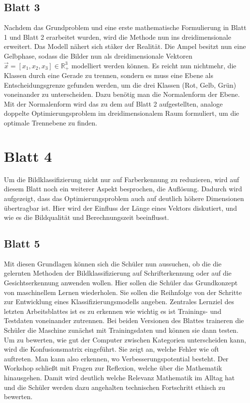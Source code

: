         \subsection{Blatt 3}
            Nachdem das Grundproblem und eine erste mathematische Formulierung in Blatt 1 und Blatt 2 erarbeitet wurden, wird die Methode nun ins dreidimensionale erweitert. Das Modell nähert sich stäker der Realität. Die Ampel besitzt nun eine Gelbphase, sodass die Bilder nun als dreidimensionale Vektoren $\vec{x}=[x_1, x_2, x_3] \in \mathbb{R}_+^3$ modelliert werden können.
            Es reicht nun nichtmehr, die Klassen durch eine Gerade zu trennen, sondern es muss eine Ebene als Entscheidungsgrenze gefunden werden, um die drei Klassen (Rot, Gelb, Grün) voneinander zu unterscheiden.
            Dazu benötig man die Normalenform der Ebene. Mit der Normalenform wird das zu dem auf Blatt 2 aufgestellten, analoge doppelte Optimierungsproblem im dreidimensionalem Raum formuliert, um die optimale Trennebene zu finden.
        \section{Blatt 4}
            Um die Bildklassifizierung nicht nur auf Farberkennung zu reduzieren, wird auf diesem Blatt noch ein weiterer Aspekt besprochen, die Auflösung. Dadurch wird aufgezeigt, dass das Optimierungsproblem auch auf deutlich höhere Dimensionen übertragbar ist.
            Hier wird der Einfluss der Länge eines Vektors diskutiert, und wie es die Bildqualität und Berechnungszeit beeinflusst.
        \subsection{Blatt 5}
            Mit diesen Grundlagen können sich die Schüler nun aussuchen, ob die die gelernten Methoden der Bildklassifizierung auf Schrifterkennung oder auf die Gesichtserkennung anwenden wollen. Hier sollen die Schüler das Grundkonzept von maschinellem Lernen wiederholen. Sie sollen die Reihnfolge von der Schritte zur Entwicklung eines Klassifizierungsmodells angeben. Zentrales Lernziel des letzten Arbeitsblattes ist es zu erkennen wie wichtig es ist Trainings- und Testdaten voneinander zutrennen. Bei beiden Versionen des Blattes traineren die Schüler die Maschine zunächst mit Trainingsdaten und können sie dann testen.
             Um zu bewerten, wie gut der Computer zwischen Kategorien unterscheiden kann, wird die Konfusionsmatrix eingeführt. Sie zeigt an, welche Fehler wie oft auftreten. Man kann also erkennen, wo Verbesserungspotential besteht. Der Workshop schließt mit Fragen zur Reflexion, welche über die Mathematik hinausgehen. Damit wird deutlich welche Relevanz Mathematik im Alltag hat und die Schüler werden dazu angehalten technischen Fortschritt ethisch zu bewerten.




